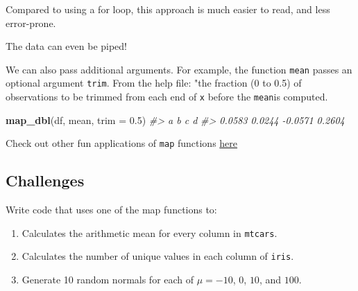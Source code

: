 \documentclass[]{book}
\newenvironment{Shaded}{\begin{snugshade}}{\end{snugshade}}
\newcommand{\CommentTok}[1]{\textcolor[rgb]{0.56,0.35,0.01}{\textit{#1}}}
\newcommand{\DataTypeTok}[1]{\textcolor[rgb]{0.13,0.29,0.53}{#1}}
\newcommand{\FloatTok}[1]{\textcolor[rgb]{0.00,0.00,0.81}{#1}}
\newcommand{\KeywordTok}[1]{\textcolor[rgb]{0.13,0.29,0.53}{\textbf{#1}}}
\newcommand{\NormalTok}[1]{#1}
\newcommand{\OperatorTok}[1]{\textcolor[rgb]{0.81,0.36,0.00}{\textbf{#1}}}
\newcommand{\StringTok}[1]{\textcolor[rgb]{0.31,0.60,0.02}{#1}}
\begin{document}
Compared to using a for loop, this approach is much easier to read, and less error-prone.

The data can even be piped!

\begin{Shaded}
\end{Shaded}

We can also pass additional arguments. For example, the function \texttt{mean} passes an optional argument \texttt{trim}. From the help file: "the fraction (0 to 0.5) of observations to be trimmed from each end of \texttt{x} before the \texttt{mean}is computed.

\begin{Shaded}
\begin{Highlighting}[]
\KeywordTok{map_dbl}\NormalTok{(df, mean, }\DataTypeTok{trim =} \FloatTok{0.5}\NormalTok{)}
\CommentTok{#>       a       b       c       d }
\CommentTok{#>  0.0583  0.0244 -0.0571  0.2604}
\end{Highlighting}
\end{Shaded}

Check out other fun applications of \texttt{map} functions \href{https://r4ds.had.co.nz/iteration.html\#the-map-functions}{here}

\hypertarget{challenges-23}{%
\subsection{Challenges}\label{challenges-23}}

Write code that uses one of the map functions to:

\begin{enumerate}
\def\labelenumi{\arabic{enumi}.}
\item
  Calculates the arithmetic mean for every column in \texttt{mtcars}.
\item
  Calculates the number of unique values in each column of \texttt{iris}.
\item
  Generate 10 random normals for each of \(\mu = -10\), \(0\), \(10\), and \(100\).
\end{enumerate}
\end{document}
